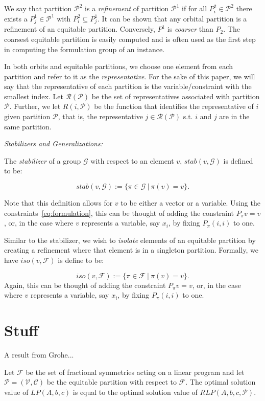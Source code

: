 \documentclass[runningheads]{llncs}
\newcommand{\cP}{{\mathcal P}}
\newcommand{\cF}{{\mathcal F}}
\newcommand{\cG}{{\mathcal G}}
\newcommand{\cC}{{\mathcal C}}
\newcommand{\cV}{{\mathcal V}}
\newcommand{\cR}{{\mathcal R}}
\begin{document}
We say that partition $\cP^2$ is a {\em refinement} of partition $\cP^1$ if for
all $P_i^2 \in \cP^2$ there exists a $P_j^1 \in \cP^1$ with $P_i^2 \subseteq
P_j^1$. It can be shown that any orbital partition is a refinement of an equitable partition. Conversely, $P^1$ is {\em coarser} than $P_2$. The coarsest equitable partition is easily computed and is often used as the first step in computing the formulation group of an instance. 

In both orbits and equitable partitions, we choose one element from each partition and refer to it as the {\em representative}. For the sake of this paper, we will say that the representative of each partition is the variable/constraint with the smallest index.  Let $\cR(\cP)$ be the set of representatives associated with partition $\cP$. Further, we let $R(i,\cP)$ be the function that identifies the representative of $i$ given partition $\cP$, that is, the representative $j \in \cR(\cP)$ s.t. $i$ and $j$ are in the same partition.



{\em Stabilizers and Generalizations:}

The {\em stabilizer} of a group $\cG$ with respect to an element $v$, $stab(v,\cG)$ is defined to be:

$$stab(v,\cG) := \{ \pi \in \cG\ | \ \pi(v) = v\}.$$ 

\noindent Note that this definition allows for  $v$ to be either a vector or a variable. Using the constraints~\eqref{eq:formulation}, this can be thought of adding the constraint $P_\pi v = v$, or, in the case where $v$ represents a variable, say $x_i$, by fixing $P_\pi(i,i)$ to one. 

Similar to the stabilizer, we wish to {\em isolate} elements of an equitable partition by creating a refinement where that element is in a singleton partition. Formally, we have $iso(v, \cF)$ is define to be:


$$iso(v,\cF) := \{ \pi \in \cF\ | \ \pi(v) = v\}.$$ 
\noindent Again, this can be thought of adding the constraint $P_\pi v = v$, or, in the case where $v$ represents a variable, say $x_i$, by fixing $P_\pi(i,i)$ to one. 



\section{Stuff}

A result from Grohe...
\begin{theorem} \label{thm:set_equal}
	Let $\cF$ be the set of fractional symmetries acting on a linear program and let $\cP = (\cV, \cC)$ be the
	equitable partition with respect to $\cF$. The optimal solution
	value of $LP(A,b,c)$ is equal to the optimal solution value of $RLP(A,b,c, \cP)$.
\end{theorem}
\end{document}
